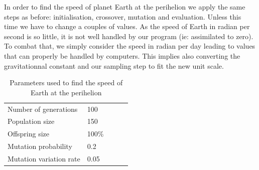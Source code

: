 In order to find the speed of planet Earth at the perihelion we apply the same steps as before: initialisation, crossover, mutation and evaluation. Unless this time we have to change a couples of values. As the speed of Earth in radian per second is so little, it is not well handled by our program (ie: assimilated to zero). To combat that, we simply consider the speed in radian per day leading to values that can properly be handled by computers. This implies also converting the gravitationnal constant and our sampling step to fit the new unit scale.

\begin{table}
    \begin{tabular}{lllll}
    Number of generations & 100 \\
    Population size & 150 \\
    Offspring size & 100\% \\
    Mutation probability & 0.2 \\
    Mutation variation rate & 0.05
    \end{tabular}
    \caption{Parameters used to find the speed of Earth at the perihelion}
\end{table}